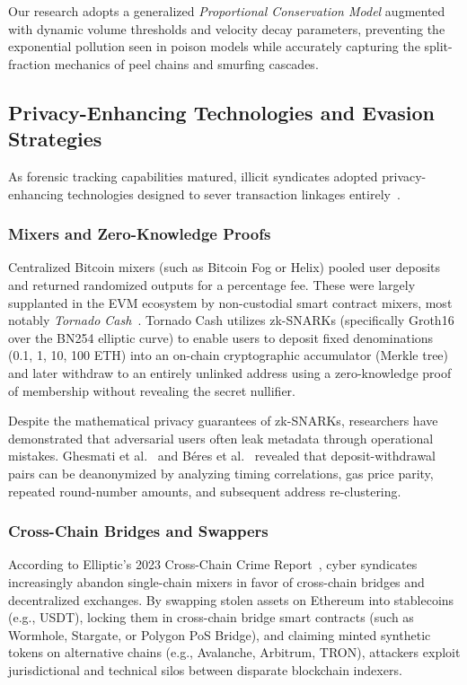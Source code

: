 Our research adopts a generalized \emph{Proportional Conservation Model} augmented with dynamic volume thresholds and velocity decay parameters, preventing the exponential pollution seen in poison models while accurately capturing the split-fraction mechanics of peel chains and smurfing cascades.

\subsection{Privacy-Enhancing Technologies and Evasion Strategies}

As forensic tracking capabilities matured, illicit syndicates adopted privacy-enhancing technologies designed to sever transaction linkages entirely~\cite{sasson2014zerocash, pertsev2020tornado}.

\subsubsection{Mixers and Zero-Knowledge Proofs}
Centralized Bitcoin mixers (such as Bitcoin Fog or Helix) pooled user deposits and returned randomized outputs for a percentage fee. These were largely supplanted in the EVM ecosystem by non-custodial smart contract mixers, most notably \emph{Tornado Cash}~\cite{pertsev2020tornado}. Tornado Cash utilizes zk-SNARKs (specifically Groth16 over the BN254 elliptic curve) to enable users to deposit fixed denominations (0.1, 1, 10, 100 ETH) into an on-chain cryptographic accumulator (Merkle tree) and later withdraw to an entirely unlinked address using a zero-knowledge proof of membership without revealing the secret nullifier.

Despite the mathematical privacy guarantees of zk-SNARKs, researchers have demonstrated that adversarial users often leak metadata through operational mistakes. Ghesmati et al.~\cite{ghesmati2022deanonymizing} and B{\'e}res et al.~\cite{beres2021blockchain} revealed that deposit-withdrawal pairs can be deanonymized by analyzing timing correlations, gas price parity, repeated round-number amounts, and subsequent address re-clustering.

\subsubsection{Cross-Chain Bridges and Swappers}
According to Elliptic's 2023 Cross-Chain Crime Report~\cite{elliptic2023typologies}, cyber syndicates increasingly abandon single-chain mixers in favor of cross-chain bridges and decentralized exchanges. By swapping stolen assets on Ethereum into stablecoins (e.g., USDT), locking them in cross-chain bridge smart contracts (such as Wormhole, Stargate, or Polygon PoS Bridge), and claiming minted synthetic tokens on alternative chains (e.g., Avalanche, Arbitrum, TRON), attackers exploit jurisdictional and technical silos between disparate blockchain indexers.


